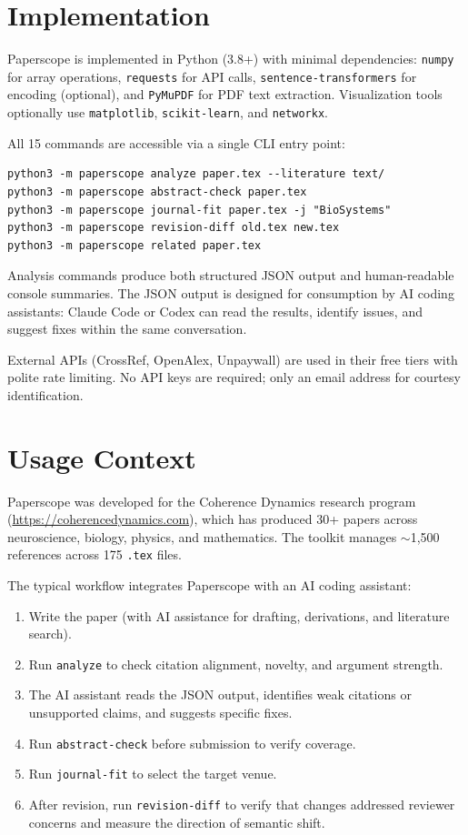 \documentclass[11pt,a4paper]{article}
\begin{document}
\section{Implementation}

Paperscope is implemented in Python (3.8+) with minimal dependencies: \texttt{numpy} for array operations, \texttt{requests} for API calls, \texttt{sentence-transformers} for encoding (optional), and \texttt{PyMuPDF} for PDF text extraction. Visualization tools optionally use \texttt{matplotlib}, \texttt{scikit-learn}, and \texttt{networkx}.

All 15 commands are accessible via a single CLI entry point:

\begin{verbatim}
python3 -m paperscope analyze paper.tex --literature text/
python3 -m paperscope abstract-check paper.tex
python3 -m paperscope journal-fit paper.tex -j "BioSystems"
python3 -m paperscope revision-diff old.tex new.tex
python3 -m paperscope related paper.tex
\end{verbatim}

Analysis commands produce both structured JSON output and human-readable console summaries. The JSON output is designed for consumption by AI coding assistants: Claude Code or Codex can read the results, identify issues, and suggest fixes within the same conversation.

External APIs (CrossRef, OpenAlex, Unpaywall) are used in their free tiers with polite rate limiting. No API keys are required; only an email address for courtesy identification.

\section{Usage Context}

Paperscope was developed for the Coherence Dynamics research program (\url{https://coherencedynamics.com}), which has produced 30+ papers across neuroscience, biology, physics, and mathematics. The toolkit manages $\sim$1,500 references across 175 \texttt{.tex} files.

The typical workflow integrates Paperscope with an AI coding assistant:

\begin{enumerate}
    \item Write the paper (with AI assistance for drafting, derivations, and literature search).
    \item Run \texttt{analyze} to check citation alignment, novelty, and argument strength.
    \item The AI assistant reads the JSON output, identifies weak citations or unsupported claims, and suggests specific fixes.
    \item Run \texttt{abstract-check} before submission to verify coverage.
    \item Run \texttt{journal-fit} to select the target venue.
    \item After revision, run \texttt{revision-diff} to verify that changes addressed reviewer concerns and measure the direction of semantic shift.
\end{enumerate}
\end{document}
